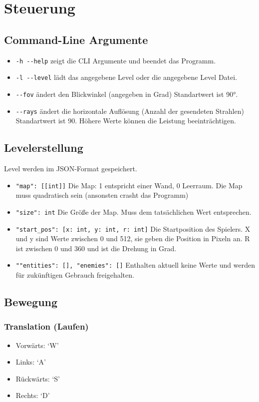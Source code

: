 \documentclass[a4paper,titlepage]{article}
\begin{document}
\newpage

\section{Steuerung}

\subsection{Command-Line Argumente}

\begin{itemize}
	\item \verb|-h --help| zeigt die CLI Argumente und beendet das Programm.
	\item \verb|-l --level| lädt das angegebene Level oder die angegebene Level Datei.
	\item \verb|--fov| ändert den Blickwinkel (angegeben in Grad) Standartwert ist 90°.
	\item \verb|--rays| ändert die horizontale Auflösung (Anzahl der gesendeten Strahlen) Standartwert ist 90. Höhere Werte können die Leistung beeinträchtigen.
\end{itemize}

\subsection{Levelerstellung}
Level werden im JSON-Format gespeichert.
\begin{itemize}
	\item \verb|"map": [[int]]| Die Map: 1 entspricht einer Wand, 0 Leerraum. Die Map muss quadratisch sein (ansonsten crasht das Programm)
	\item \verb|"size": int| Die Größe der Map. Muss dem tatsächlichen Wert entsprechen.
	\item \verb|"start_pos": [x: int, y: int, r: int]| Die Startposition des Spielers. X und y sind Werte zwischen 0 und 512, sie geben die Position in Pixeln an. R ist zwischen 0 und 360 und ist die Drehung in Grad.
	\item \verb|""entities": [], "enemies": []| Enthalten aktuell keine Werte und werden für zukünftigen Gebrauch freigehalten.
	
\end{itemize}

\subsection{Bewegung}

\subsubsection{Translation (Laufen)}
\begin{itemize}
\item Vorwärts: `W'
\item Links: `A'
\item Rückwärts: `S'
\item Rechts: `D'
\end{itemize}
\end{document}
